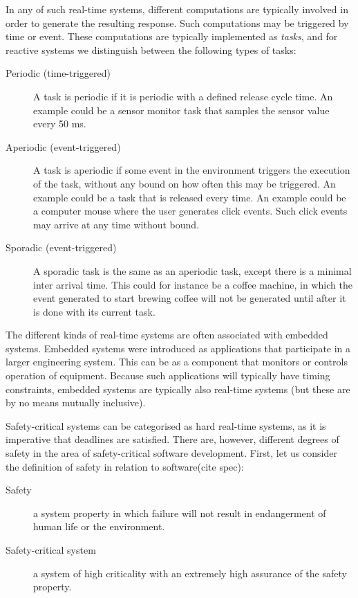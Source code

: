 In any of such real-time systems, different computations are typically involved in order to generate the resulting response. Such computations may be triggered by time or event. These computations are typically implemented as \textit{tasks}, and for reactive systems we distinguish between the following types of tasks:
\begin{description}
	\item[Periodic (time-triggered)] A task is periodic if it is periodic with a defined release cycle time. An example could be a sensor monitor task that samples the sensor value every 50 ms.
	\item[Aperiodic (event-triggered)] A task is aperiodic if some event in the environment triggers the execution of the task, without any bound on how often this may be triggered. An example could be a task that is released every time. An example could be a computer mouse where the user generates click events. Such click events may arrive at any time without bound.
	\item[Sporadic (event-triggered)] A sporadic task is the same as an aperiodic task, except there is a minimal inter arrival time. This could for instance be a coffee machine, in which the event generated to start brewing coffee will not be generated until after it is done with its current task.
\end{description}

The different kinds of real-time systems are often associated with embedded systems. Embedded systems were introduced as applications that participate in a larger engineering system. This can be as a component that monitors or controls operation of equipment. Because such applications will typically have timing constraints, embedded systems are typically also real-time systems (but these are by no means mutually inclusive).

Safety-critical systems can be categorised as hard real-time systems, as it is imperative that deadlines are satisfied. There are, however, different degrees of safety in the area of safety-critical software development. First, let us consider the definition of safety in relation to software(cite spec):
\begin{description}
	\item[Safety] a system property in which failure will not result in endangerment of human life or the environment.
	\item[Safety-critical system] a system of high criticality with an extremely high assurance of the safety property.
\end{description}

